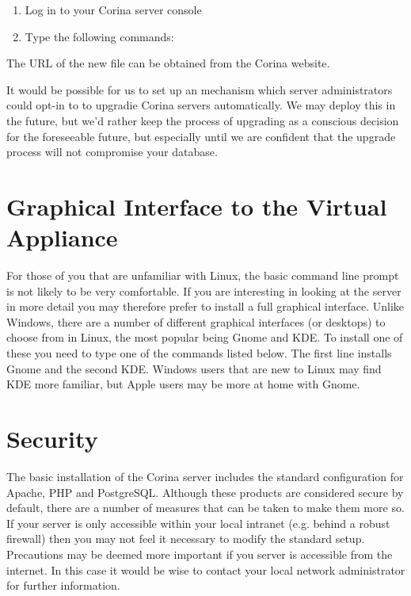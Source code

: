 \begin{enumerate}
 \item Log in to your Corina server console 
 \item Type the following commands: 
\end{enumerate}

The URL of the new file can be obtained from the Corina website.  

It would be possible for us to set up an mechanism which server administrators could opt-in to to upgradie Corina servers automatically.  We may deploy this in the future, but we'd rather keep the process of upgrading as a conscious decision for the foreseeable future, but especially until we are confident that the upgrade process will not compromise your database.


\section{Graphical Interface to the Virtual Appliance}
For those of you that are unfamiliar with Linux, the basic command line prompt is not likely to be very comfortable.  If you are interesting in looking at the server in more detail you may therefore prefer to install a full graphical interface.  Unlike Windows, there are a number of different graphical interfaces (or desktops) to choose from in Linux, the most popular being Gnome and KDE.  To install one of these you need to type one of the commands listed below.  The first line installs Gnome and the second KDE. Windows users that are new to Linux may find KDE more familiar, but Apple users may be more at home with Gnome.


\section{Security}
The basic installation of the Corina server includes the standard configuration for Apache, PHP and PostgreSQL.  Although these products are considered secure by default, there are a number of measures that can be taken to make them more so.  If your server is only accessible within your local intranet (e.g. behind a robust firewall) then you may not feel it necessary to modify the standard setup.  Precautions may be deemed more important if you server is accessible from the internet.  In this case it would be wise to contact your local network administrator for further information.

